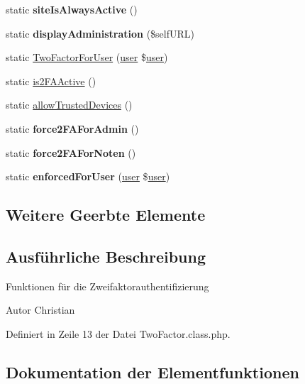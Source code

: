 \begin{DoxyCompactItemize}
static {\bfseries site\+Is\+Always\+Active} ()
\item 
\mbox{\label{class_two_factor_a2b2505fb57c9ce6fd2800fbae441c5d3}} 
static {\bfseries display\+Administration} (\$self\+U\+RL)
\item 
static \mbox{\hyperlink{class_two_factor_a504f0bf8fd9701621f2542bfc02468c2}{Two\+Factor\+For\+User}} (\mbox{\hyperlink{classuser}{user}} \$\mbox{\hyperlink{classuser}{user}})
\item 
static \mbox{\hyperlink{class_two_factor_af534f03f27dd9f4806fb35e60c14608e}{is2\+F\+A\+Active}} ()
\item 
static \mbox{\hyperlink{class_two_factor_a8f754688fdac1d9a01ad4ad883c56c8e}{allow\+Trusted\+Devices}} ()
\item 
\mbox{\label{class_two_factor_a99ae61486f9d32d29200dcb50080ec39}} 
static {\bfseries force2\+F\+A\+For\+Admin} ()
\item 
\mbox{\label{class_two_factor_a9f30ed4dea1fc0185858fa75ddb7394c}} 
static {\bfseries force2\+F\+A\+For\+Noten} ()
\item 
\mbox{\label{class_two_factor_a9a54cf803753aa0460e4f1def42ab167}} 
static {\bfseries enforced\+For\+User} (\mbox{\hyperlink{classuser}{user}} \$\mbox{\hyperlink{classuser}{user}})
\end{DoxyCompactItemize}
\subsection*{Weitere Geerbte Elemente}


\subsection{Ausführliche Beschreibung}
Funktionen für die Zweifaktorauthentifizierung \begin{DoxyAuthor}{Autor}
Christian 
\end{DoxyAuthor}


Definiert in Zeile 13 der Datei Two\+Factor.\+class.\+php.



\subsection{Dokumentation der Elementfunktionen}
\mbox{\label{class_two_factor_a8f754688fdac1d9a01ad4ad883c56c8e}} 

